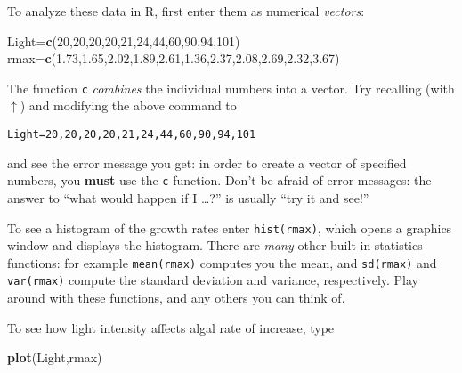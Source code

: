 \documentclass[11pt,]{article}
\newenvironment{Shaded}{\begin{snugshade}}{\end{snugshade}}
\newcommand{\KeywordTok}[1]{\textcolor[rgb]{0.13,0.29,0.53}{\textbf{#1}}}
\newcommand{\DecValTok}[1]{\textcolor[rgb]{0.00,0.00,0.81}{#1}}
\newcommand{\FloatTok}[1]{\textcolor[rgb]{0.00,0.00,0.81}{#1}}
\newcommand{\NormalTok}[1]{#1}
\begin{document}
To analyze these data in R, first enter them as numerical
\emph{vectors}:

\begin{Shaded}
\begin{Highlighting}[]
\NormalTok{Light=}\KeywordTok{c}\NormalTok{(}\DecValTok{20}\NormalTok{,}\DecValTok{20}\NormalTok{,}\DecValTok{20}\NormalTok{,}\DecValTok{20}\NormalTok{,}\DecValTok{21}\NormalTok{,}\DecValTok{24}\NormalTok{,}\DecValTok{44}\NormalTok{,}\DecValTok{60}\NormalTok{,}\DecValTok{90}\NormalTok{,}\DecValTok{94}\NormalTok{,}\DecValTok{101}\NormalTok{)}
\NormalTok{rmax=}\KeywordTok{c}\NormalTok{(}\FloatTok{1.73}\NormalTok{,}\FloatTok{1.65}\NormalTok{,}\FloatTok{2.02}\NormalTok{,}\FloatTok{1.89}\NormalTok{,}\FloatTok{2.61}\NormalTok{,}\FloatTok{1.36}\NormalTok{,}\FloatTok{2.37}\NormalTok{,}\FloatTok{2.08}\NormalTok{,}\FloatTok{2.69}\NormalTok{,}\FloatTok{2.32}\NormalTok{,}\FloatTok{3.67}\NormalTok{)}
\end{Highlighting}
\end{Shaded}

The function \texttt{c} \emph{combines} the individual numbers into a
vector. Try recalling (with \(\uparrow\)) and modifying the above
command to

\begin{verbatim}
Light=20,20,20,20,21,24,44,60,90,94,101
\end{verbatim}

and see the error message you get: in order to create a vector of
specified numbers, you \textbf{must} use the \texttt{c} function. Don't
be afraid of error messages: the answer to ``what would happen if I
\ldots{}?'' is usually ``try it and see!''

To see a histogram of the growth rates enter \texttt{hist(rmax)}, which
opens a graphics window and displays the histogram. There are
\emph{many} other built-in statistics functions: for example
\texttt{mean(rmax)} computes you the mean, and \texttt{sd(rmax)} and
\texttt{var(rmax)} compute the standard deviation and variance,
respectively. Play around with these functions, and any others you can
think of.

To see how light intensity affects algal rate of increase, type

\begin{Shaded}
\begin{Highlighting}[]
\KeywordTok{plot}\NormalTok{(Light,rmax)}
\end{Highlighting}
\end{Shaded}
\end{document}
